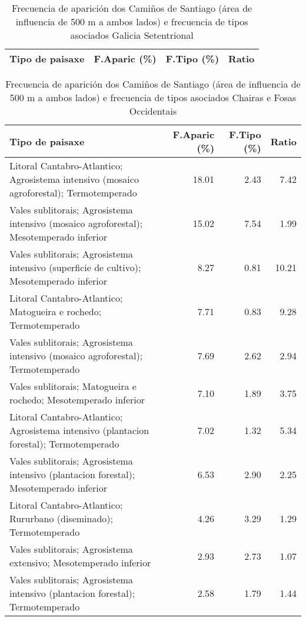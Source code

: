 \begin{table}[p]
\centering
\caption{Frecuencia de aparición dos Camiños de Santiago (área de influencia de 500 m a ambos lados) e frecuencia de tipos asociados Galicia Setentrional} 
\label{vcamino10}
\begin{tabular}{lrrr}
  \hline
Tipo de paisaxe & F.Aparic (\%) & F.Tipo (\%) & Ratio \\ 
  \hline
\hline
\end{tabular}
\end{table}
\begin{table}[p]
\centering
\caption{Frecuencia de aparición dos Camiños de Santiago (área de influencia de 500 m a ambos lados) e frecuencia de tipos asociados Chairas e Fosas Occidentais} 
\label{vcamino11}
\begin{tabular}{lrrr}
  \hline
Tipo de paisaxe & F.Aparic (\%) & F.Tipo (\%) & Ratio \\ 
  \hline
Litoral Cantabro-Atlantico; Agrosistema intensivo (mosaico agroforestal); Termotemperado & 18.01 & 2.43 & 7.42 \\ 
  Vales sublitorais; Agrosistema intensivo (mosaico agroforestal); Mesotemperado inferior & 15.02 & 7.54 & 1.99 \\ 
  Vales sublitorais; Agrosistema intensivo (superficie de cultivo); Mesotemperado inferior & 8.27 & 0.81 & 10.21 \\ 
  Litoral Cantabro-Atlantico; Matogueira e rochedo; Termotemperado & 7.71 & 0.83 & 9.28 \\ 
  Vales sublitorais; Agrosistema intensivo (mosaico agroforestal); Termotemperado & 7.69 & 2.62 & 2.94 \\ 
  Vales sublitorais; Matogueira e rochedo; Mesotemperado inferior & 7.10 & 1.89 & 3.75 \\ 
  Litoral Cantabro-Atlantico; Agrosistema intensivo (plantacion forestal); Termotemperado & 7.02 & 1.32 & 5.34 \\ 
  Vales sublitorais; Agrosistema intensivo (plantacion forestal); Mesotemperado inferior & 6.53 & 2.90 & 2.25 \\ 
  Litoral Cantabro-Atlantico; Rururbano (diseminado); Termotemperado & 4.26 & 3.29 & 1.29 \\ 
  Vales sublitorais; Agrosistema extensivo; Mesotemperado inferior & 2.93 & 2.73 & 1.07 \\ 
  Vales sublitorais; Agrosistema intensivo (plantacion forestal); Termotemperado & 2.58 & 1.79 & 1.44 \\ 

\end{tabular}
\end{table}
